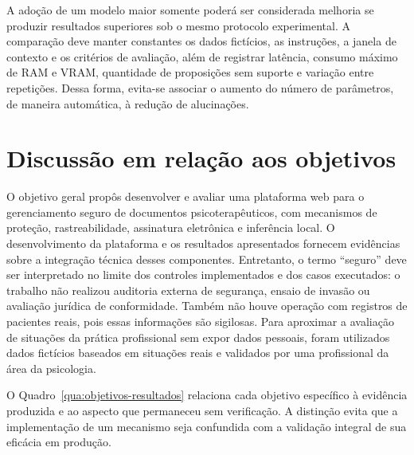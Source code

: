 A adoção de um modelo maior somente poderá ser considerada melhoria se produzir resultados superiores sob o mesmo protocolo experimental. A comparação deve manter constantes os dados fictícios, as instruções, a janela de contexto e os critérios de avaliação, além de registrar latência, consumo máximo de RAM e VRAM, quantidade de proposições sem suporte e variação entre repetições. Dessa forma, evita-se associar o aumento do número de parâmetros, de maneira automática, à redução de alucinações.

\section{Discussão em relação aos objetivos}

O objetivo geral propôs desenvolver e avaliar uma plataforma web para o gerenciamento seguro de documentos psicoterapêuticos, com mecanismos de proteção, rastreabilidade, assinatura eletrônica e inferência local. O desenvolvimento da plataforma e os resultados apresentados fornecem evidências sobre a integração técnica desses componentes. Entretanto, o termo ``seguro'' deve ser interpretado no limite dos controles implementados e dos casos executados: o trabalho não realizou auditoria externa de segurança, ensaio de invasão ou avaliação jurídica de conformidade. Também não houve operação com registros de pacientes reais, pois essas informações são sigilosas. Para aproximar a avaliação de situações da prática profissional sem expor dados pessoais, foram utilizados dados fictícios baseados em situações reais e validados por uma profissional da área da psicologia.

O Quadro~\ref{qua:objetivos-resultados} relaciona cada objetivo específico à evidência produzida e ao aspecto que permaneceu sem verificação. A distinção evita que a implementação de um mecanismo seja confundida com a validação integral de sua eficácia em produção.

